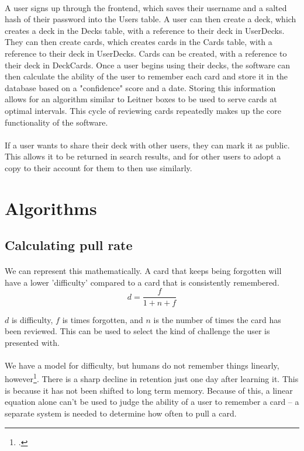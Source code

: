 \documentclass{report}
\begin{document}
\paragraph{}
A user signs up through the frontend, which saves their username and a salted hash of their password into the Users table. A user can then create a deck, which creates a deck in the Decks table, with a reference to their deck in UserDecks. They can then create cards, which creates cards in the Cards table, with a reference to their deck in UserDecks. Cards can be created, with a reference to their deck in DeckCards. Once a user begins using their decks, the software can then calculate the ability of the user to remember each card and store it in the database based on a "confidence" score and a date. Storing this information allows for an algorithm similar to Leitner boxes to be used to serve cards at optimal intervals. This cycle of reviewing cards repeatedly makes up the core functionality of the software.

\paragraph{}
If a user wants to share their deck with other users, they can mark it as public. This allows it to be returned in search results, and for other users to adopt a copy to their account for them to then use similarly.

\section{Algorithms}
\subsection{Calculating pull rate}
\paragraph{}
We can represent this mathematically. A card that keeps being forgotten will have a lower 'difficulty' compared to a card that is consistently remembered.
\[d = \frac{f}{1 + n + f} \]

$d$ is difficulty, $f$ is times forgotten, and $n$ is the number of times the card has been reviewed.
This can be used to select the kind of challenge the user is presented with.

\paragraph{}
We have a model for difficulty, but humans do not remember things linearly, however\footcite{ForgettingCurve}. There is a sharp decline in retention just one day after learning it. This is because it has not been shifted to long term memory. Because of this, a linear equation alone can't be used to judge the ability of a user to remember a card -- a separate system is needed to determine how often to pull a card.
\end{document}
